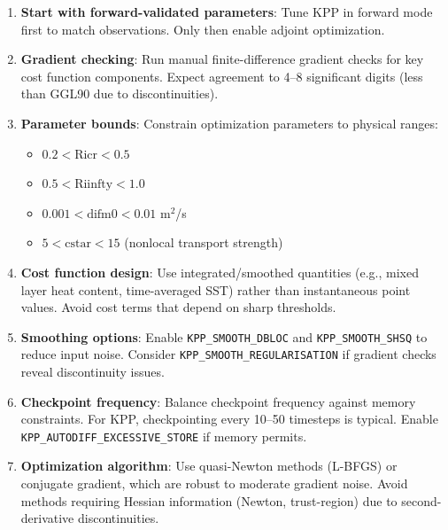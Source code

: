 \documentclass[12pt,letterpaper]{article}
\begin{document}
\begin{enumerate}[leftmargin=*]
  \item \textbf{Start with forward-validated parameters}: Tune KPP in forward mode
        first to match observations. Only then enable adjoint optimization.

  \item \textbf{Gradient checking}: Run manual finite-difference gradient checks
        for key cost function components. Expect agreement to 4--8 significant digits
        (less than GGL90 due to discontinuities).

  \item \textbf{Parameter bounds}: Constrain optimization parameters to physical ranges:
  \begin{itemize}
    \item $0.2 < \text{Ricr} < 0.5$
    \item $0.5 < \text{Riinfty} < 1.0$
    \item $0.001 < \text{difm0} < 0.01$ m$^2$/s
    \item $5 < \text{cstar} < 15$ (nonlocal transport strength)
  \end{itemize}

  \item \textbf{Cost function design}: Use integrated/smoothed quantities
        (e.g., mixed layer heat content, time-averaged SST) rather than instantaneous
        point values. Avoid cost terms that depend on sharp thresholds.

  \item \textbf{Smoothing options}: Enable \texttt{KPP\_SMOOTH\_DBLOC} and
        \texttt{KPP\_SMOOTH\_SHSQ} to reduce input noise. Consider
        \texttt{KPP\_SMOOTH\_REGULARISATION} if gradient checks reveal discontinuity
        issues.

  \item \textbf{Checkpoint frequency}: Balance checkpoint frequency against memory
        constraints. For KPP, checkpointing every 10--50 timesteps is typical.
        Enable \texttt{KPP\_AUTODIFF\_EXCESSIVE\_STORE} if memory permits.

  \item \textbf{Optimization algorithm}: Use quasi-Newton methods (L-BFGS) or
        conjugate gradient, which are robust to moderate gradient noise. Avoid
        methods requiring Hessian information (Newton, trust-region) due to second-
        derivative discontinuities.
\end{enumerate}
\end{document}
